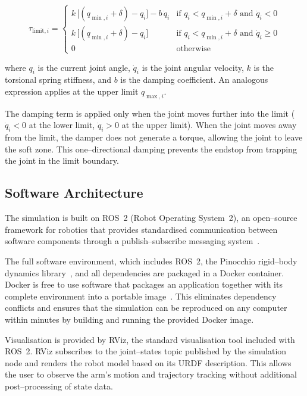 \documentclass[11pt,a4paper,twoside,openright]{book}
\begin{document}
\begin{equation}\label{eq:soft-limit}
    \tau_{\mathrm{limit},i} = 
    \begin{cases}
        k\,\bigl[(q_{\min,i} + \delta) - q_i\bigr] - b\,\dot{q}_i & \text{if } q_i < q_{\min,i} + \delta \text{ and } \dot{q}_i < 0 \\[4pt]
        k\,\bigl[(q_{\min,i} + \delta) - q_i\bigr] & \text{if } q_i < q_{\min,i} + \delta \text{ and } \dot{q}_i \geq 0 \\[4pt]
        0 & \text{otherwise}
    \end{cases}
\end{equation}

where $q_i$ is the current joint angle, $\dot{q}_i$ is the joint angular velocity, $k$ is the torsional spring stiffness, and $b$ is the damping coefficient. An analogous expression applies at the upper limit $q_{\max,i}$.

The damping term is applied only when the joint moves further into the limit ($\dot{q}_i < 0$ at the lower limit, $\dot{q}_i > 0$ at the upper limit). When the joint moves away from the limit, the damper does not generate a torque, allowing the joint to leave the soft zone. This one--directional damping prevents the endstop from trapping the joint in the limit boundary.

\subsection{Software Architecture}
\label{subsec:sim-architecture}

The simulation is built on ROS~2 (Robot Operating System~2), an open--source framework for robotics that provides standardised communication between software components through a publish--subscribe messaging system~\cite{ROSHome}.

The full software environment, which includes ROS~2, the Pinocchio rigid--body dynamics library~\cite{Pinocchio}, and all dependencies are packaged in a Docker container. Docker is free to use software that packages an application together with its complete environment into a portable image~\cite{DockerAcceleratedContainer}. This eliminates dependency conflicts and ensures that the simulation can be reproduced on any computer within minutes by building and running the provided Docker image.

Visualisation is provided by RViz, the standard visualisation tool included with ROS~2. RViz subscribes to the joint--states topic published by the simulation node and renders the robot model based on its URDF description. This allows the user to observe the arm's motion and trajectory tracking without additional post--processing of state data.
\end{document}
